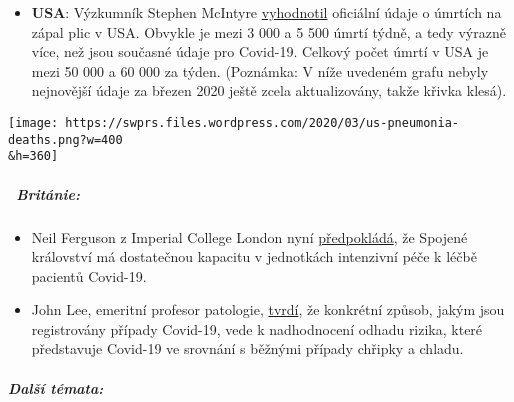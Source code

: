 \begin{itemize}
\tightlist
\item
  \textbf{USA}: Výzkumník Stephen McIntyre
  \href{https://twitter.com/ClimateAudit/status/1243019315462516736}{vyhodnotil}
  oficiální údaje o úmrtích na zápal plic v USA. Obvykle je mezi 3 000 a
  5 500 úmrtí týdně, a tedy výrazně více, než jsou současné údaje pro
  Covid-19. Celkový počet úmrtí v USA je mezi 50 000 a 60 000 za týden.
  (Poznámka: V níže uvedeném grafu nebyly nejnovější údaje za březen
  2020 ještě zcela aktualizovány, takže křivka klesá).
\end{itemize}

\texttt{[image: https://swprs.files.wordpress.com/2020/03/us-pneumonia-deaths.png?w=400\\\&h=360]}

\hypertarget{-brituxe1nie}{%
\subparagraph{\texorpdfstring{\textbf{~Británie:}}{~Británie:}}\label{-brituxe1nie}}

\begin{itemize}
\tightlist
\item
  Neil Ferguson z Imperial College London nyní
  \href{https://www.newscientist.com/article/2238578-uk-has-enough-intensive-care-units-for-coronavirus-expert-predicts/}{předpokládá},
  že Spojené království má dostatečnou kapacitu v jednotkách intenzivní
  péče k léčbě pacientů Covid-19.
\item
  John Lee, emeritní profesor patologie,
  \href{https://www.spectator.co.uk/article/The-evidence-on-Covid-19-is-not-as-clear-as-we-think}{tvrdí},
  že konkrétní způsob, jakým jsou registrovány případy Covid-19, vede k
  nadhodnocení odhadu rizika, které představuje Covid-19 ve srovnání s
  běžnými případy chřipky a chladu.
\end{itemize}

\hypertarget{dalux161uxed-tuxe9mata}{%
\subparagraph{\texorpdfstring{\textbf{Další
témata:}}{Další témata:}}\label{dalux161uxed-tuxe9mata}}

